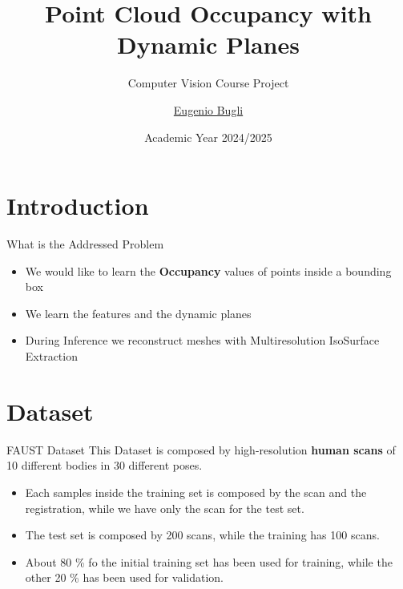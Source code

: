 \documentclass{beamer}
\title{Point Cloud Occupancy with Dynamic Planes}
\subtitle{Computer Vision Course Project}
\author{\href{mailto:bugli.1934824@studenti.uniroma1.it}{Eugenio Bugli}}
\date{Academic Year 2024/2025}
\begin{document}
\maketitle

\section{Introduction}

\begin{frame}{What is the Addressed Problem}
\begin{itemize}
	  \item We would like to learn the \textbf{Occupancy} values of points inside a bounding box
	  \item We learn the features and the dynamic planes 
	  \item During Inference we reconstruct meshes with Multiresolution IsoSurface Extraction
\end{itemize}
\end{frame} 

\section{Dataset}

\begin{frame}{FAUST Dataset}
    This Dataset is composed by high-resolution \textbf{human scans} of 10 different bodies in 30 different poses. 
    \begin{itemize}
    \item Each samples inside the training set is composed by the scan and the registration, while we have only the scan for the test set.
    \item The test set is composed by 200 scans, while the training has 100 scans.
    \item About 80 \% fo the initial training set has been used for training, while the other 20 \% has been used for validation.
    \end{itemize}
\end{frame}


\end{document}
